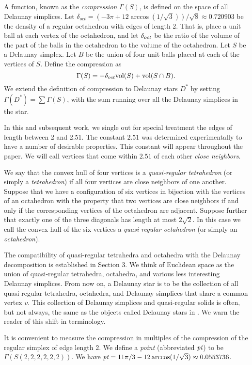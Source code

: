 A function, known as the {\it compression\/} $\Gamma(S)$, is defined on
the space of all Delaunay simplices.  Let 
$\delta_{oct} = (-3\pi+12\arccos(1/\sqrt{3}))/\sqrt{8}\approx 0.720903$
be the density of a regular octahedron with edges of length 2.
That is, place a unit ball at each vertex of the
octahedron, and let $\delta_{oct}$ be the ratio of the volume of the
part of the balls in the octahedron to the volume of the octahedron.
Let $S$ be a Delaunay simplex.  Let $B$ be the union of
four unit balls placed at each of the vertices of $S$.
Define the compression as
$$\Gamma(S) = -\delta_{oct} \hbox{vol}(S) + \hbox{vol}(S\cap B).$$
We extend the definition of compression to Delaunay stars $D^*$
by setting $\Gamma(D^*) = \sum\Gamma(S)$, with the sum running
over all the Delaunay simplices in the star.  

In this and subsequent work, we single out for
special treatment the edges of length between 2 and 2.51.
The constant $2.51$ was determined experimentally to have a number of
desirable properties.  This constant will appear throughout
the paper.  We will call vertices that come within $2.51$ of each
other {\it close neighbors}.

We say that the convex hull of four vertices
is a 
{\it quasi-regular tetrahedron\/} (or simply a {\it tetrahedron})
if all four vertices are close neighbors of one another.
Suppose that we have a configuration of
six vertices in bijection with the vertices
of an octahedron with the property that two vertices are close
neighbors if and only if the corresponding vertices of the
octahedron are adjacent.
Suppose further that exactly one of the three diagonals has
length at most $2\sqrt{2}$.
  In this
case we call the convex hull of the six vertices a
{\it quasi-regular
octahedron\/} (or simply an {\it octahedron}).

The compatibility of quasi-regular tetrahedra and octahedra with 
the Delaunay decomposition
is established in Section 3.
We think of Euclidean space as
the union of quasi-regular tetrahedra, octahedra, and various
less interesting Delaunay simplices.  From now on, a Delaunay
star is to be the collection of all quasi-regular tetrahedra, octahedra,
and Delaunay simplices 
that share a common vertex $v$.  This collection of
Delaunay simplices and quasi-regular solids is often, but not
always, the same as the objects called Delaunay stars in \cite{H2}.  We
warn the reader of this shift in terminology.


It is convenient to measure the compression in multiples of
the compression of the regular simplex of edge length 2.
We define a {\it point} (abbreviated $\hbox{\it pt}$) to be
$\Gamma(S(2,2,2,2,2,2))$. 
We have $\hbox{\it pt} = 
        {11\pi/3 -12\arccos(1/\sqrt{3})}\approx 0.0553736$.

